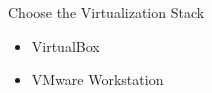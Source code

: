 \begin{frame}{Choose the Virtualization Stack}
  \begin{itemize}
    \item VirtualBox
    \item VMware Workstation
  \end{itemize}
\end{frame}
